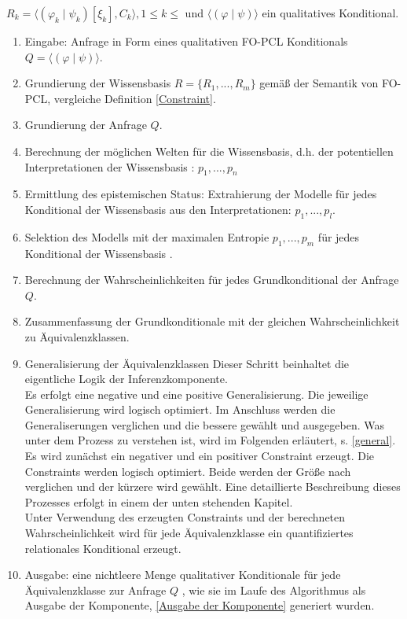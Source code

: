 \documentclass[a4paper, 11pt]{book}
\begin{document}
$ R_k =  \langle(\varphi_k \mid \psi_k)[\xi_k], C_k \rangle , 1 \leq k \leq  $ und $ \langle (\varphi \mid \psi) \rangle $ ein qualitatives Konditional.
\begin{enumerate}
	\item Eingabe: Anfrage in Form eines qualitativen FO-PCL Konditionals\\
	$ Q = \langle (\varphi \mid \psi) \rangle $.
	\item Grundierung der Wissensbasis $ R = \{R_1, ..., R_m\} $ gemäß der Semantik von FO-PCL, vergleiche Definition \ref{Constraint}.
	\item Grundierung der Anfrage $ Q $.
	\item Berechnung der möglichen Welten für die Wissensbasis, d.h. der potentiellen Interpretationen der Wissensbasis : $ p_1, ..., p_n $
	\item Ermittlung des epistemischen Status: Extrahierung der Modelle für jedes Konditional der Wissensbasis aus den Interpretationen: $ p_1, ..., p_l $.
	\item Selektion des Modells mit der maximalen Entropie $p_1, ..., p_m$ für jedes Konditional der Wissensbasis .
	\item Berechnung der Wahrscheinlichkeiten für jedes Grundkonditional der Anfrage $ Q $.
	\item Zusammenfassung der Grundkonditionale mit der gleichen Wahrscheinlichkeit zu Äquivalenzklassen. 

	\item Generalisierung der Äquivalenzklassen 
	Dieser Schritt beinhaltet die eigentliche Logik der Inferenzkomponente.\\
	Es erfolgt eine negative und eine positive Generalisierung. Die jeweilige Generalisierung wird logisch optimiert. Im Anschluss werden die Generaliserungen verglichen und die bessere gewählt und ausgegeben. Was unter dem Prozess zu verstehen ist, wird im Folgenden erläutert, s. \ref{general}. 
	Es wird zunächst ein negativer und ein positiver Constraint erzeugt. Die Constraints werden logisch optimiert. Beide werden der Größe nach verglichen und der kürzere wird gewählt. Eine detaillierte Beschreibung dieses Prozesses erfolgt in einem der unten stehenden Kapitel.\\
	Unter Verwendung des erzeugten Constraints und der berechneten Wahrscheinlichkeit wird für jede Äquivalenzklasse ein quantifiziertes relationales Konditional erzeugt.
	
	\item Ausgabe: eine nichtleere Menge qualitativer Konditionale für jede Äquivalenzklasse zur Anfrage $ Q $ , wie sie im Laufe des Algorithmus als Ausgabe der Komponente, \ref{Ausgabe der Komponente} generiert wurden.
	
	
	
\end{enumerate}
\end{document}
